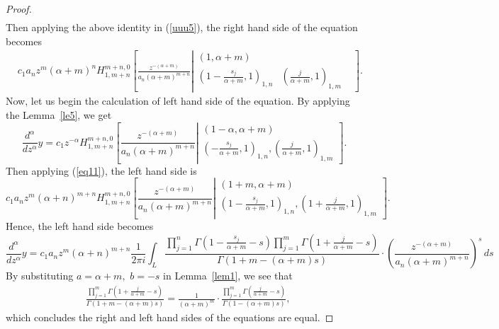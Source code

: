 \documentclass[12pt]{article}
\theoremstyle{definition}
\begin{document}
\begin{proof}
\begin{align*}
\end{align*}
Then applying the above identity in (\ref{uuu5}), the right hand side of the equation becomes
\begin{align*}
& c_1a_nz^m(\alpha+m)^n H_{1,m+n}^{m+n,0} \left[ \frac{z^{-(\alpha+m)}}{a_n(\alpha+m)^{m+n}} \left| \begin{matrix}
( 1 , \alpha+m )  \\
 ( 1-\frac{s_j}{\alpha+m} , 1 )_{1,n} & (\frac{j}{\alpha+m} , 1  )_{1,m} &  \end{matrix}\right.\right]. 
\end{align*}
Now, let us begin the calculation of left hand side of the equation. By applying the Lemma~\ref{le5}, we get
\begin{equation*}
 \frac{d^{\alpha}}{dz^{\alpha}}y=c_1z^{-\alpha}H_{1,m+n}^{m+n,0} \left[ \frac{z^{-(\alpha+m)}}{a_n(\alpha+m)^{m+n}} \left| \begin{matrix}
( 1-\alpha , \alpha+m )\\( -\frac{s_j}{\alpha+m} , 1 )_{1,n}, (\frac{j}{\alpha+m} , 1  )_{1,m}  \end{matrix}\right.\right].   
\end{equation*}
Then applying (\ref{eq11}),  the left hand side is
$$c_1a_nz^m(\alpha+n)^{m+n}H_{1,m+n}^{m+n,0} \left[ \frac{z^{-(\alpha+m)}}{a_n(\alpha+m)^{m+n}} \left| \begin{matrix}
( 1+m , \alpha+m )\\( 1-\frac{s_j}{\alpha+m} , 1 )_{1,n}, (1+\frac{j}{\alpha+m} , 1  )_{1,m}  \end{matrix}\right.\right].$$
Hence, the left hand side becomes
\begin{equation*}
\frac{d^{\alpha}}{dz^{\alpha}}y=
c_1a_nz^m(\alpha+n)^{m+n}\frac{1}{2\pi i}\int_{L}{\frac{\prod\limits_{j=1}^n\Gamma\left( 1-\frac{s_j}{\alpha+m}-s\right)\prod\limits_{j=1}^{m} \Gamma\left(1+\frac{j}{\alpha+m}-s\right)}{\Gamma\left(1+m-(\alpha+m)s\right)}\cdot\left(\frac{z^{-(\alpha+m)}}{a_n(\alpha+m)^{m+n}}\right)^{s}\,d} s
\end{equation*}
By substituting $a=\alpha+m,$ $b=-s$ in Lemma~\ref{lem1}, we see that
\begin{align*}
&\frac{\prod\limits_{j=1}^{m} \Gamma\left(1+\frac{j}{\alpha+m}-s\right)}{\Gamma(1+m-(\alpha+m)s)}= \frac{1}{(\alpha+m)^m}\cdot\frac{\prod\limits_{j=1}^{m}\Gamma\left(\frac{j}{\alpha+m}-s\right)}{\Gamma(1-(\alpha+m)s)},
\end{align*}
which concludes the right and left hand sides of the equations are equal.


\end{proof}
\end{document}
